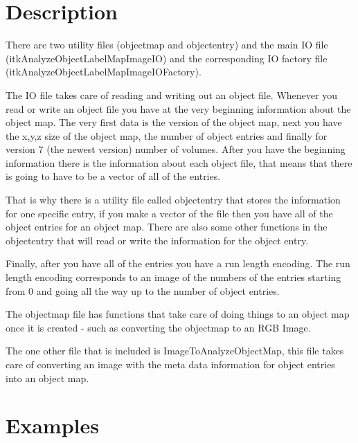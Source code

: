 \documentclass{InsightArticle}
\begin{document}
\section{Description}
There are two utility files (objectmap and objectentry) and the main IO file (itkAnalyzeObjectLabelMapImageIO) and the corresponding
IO factory file (itkAnalyzeObjectLabelMapImageIOFactory).  

The IO file takes care of reading and writing out an object file.  Whenever
you read or write an object file you have at the very beginning information about the object map.  The very first data is the version
of the object map, next you have the x,y,z size of the object map, the number of object entries and finally for version 7 (the newest
version) number of volumes.  After you have the beginning information there is the information about each object file, that means that
there is going to have to be a vector of all of the entries.  

That is why there is a utility file called objectentry that stores the
information for one specific entry, if you make a vector of the file then you have all of the object entries for an object map.  There
are also some other functions in the objectentry that will read or write the information for the object entry.  

Finally, after you have all of the entries you have a run length encoding.  The run length encoding corresponds to an image of the numbers of the entries starting from 0 and going all the way up to the number of object entries.  

The objectmap file has functions that take care of doing things to an object map once it is created - such as converting the objectmap to an RGB Image. 

The one other file that is included is ImageToAnalyzeObjectMap, this file takes care of converting an image with the meta data information for object entries into an object map.

\section{Examples}
\end{document}
